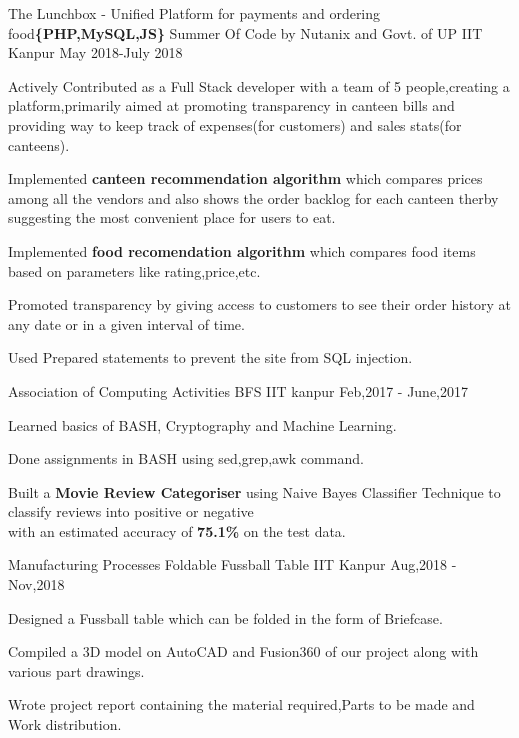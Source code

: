 
\begin{cventries}

  \cventry
  {The Lunchbox - Unified Platform for payments and ordering food\textbf{\{PHP,MySQL,JS\}}}
  {Summer Of Code by Nutanix and Govt. of UP}
  {IIT Kanpur}
  {May 2018-July 2018}
  {
    \begin{cvitems}
     \item Actively Contributed as a Full Stack developer with a team of 5 people,creating a platform,primarily aimed at promoting transparency in canteen bills and providing way to keep track of expenses(for customers) and sales stats(for canteens). 
     \item Implemented \textbf{canteen recommendation algorithm} which compares prices among all the vendors and also shows the order backlog for each canteen therby suggesting the most convenient place for users to eat. 
     \item Implemented \textbf{food recomendation algorithm} which compares food items based on parameters like rating,price,etc.
     \item Promoted transparency by giving access to customers to see their order history at any date or in a given interval of time. 
     \item Used Prepared statements to prevent the site from SQL injection.
    \end{cvitems}
  }

  \cventry
  {Association of Computing Activities}
  {BFS}
  {IIT kanpur}
  {Feb,2017 - June,2017}
  {
     \begin{cvitems}
      \item Learned basics of BASH, Cryptography and Machine Learning.
      \item Done assignments in BASH using sed,grep,awk command.
      \item Built a \textbf{Movie Review Categoriser} using Naive Bayes Classifier Technique
            to classify reviews into positive or negative\\ with an estimated accuracy of \textbf{75.1\%} on the test data.
     \end{cvitems}
  }

  \cventry 
  {Manufacturing Processes}
  {Foldable Fussball Table}
  {IIT Kanpur}
  {Aug,2018 - Nov,2018}
  {
    \begin{cvitems}
      \item Designed a Fussball table which can be folded in the form of Briefcase.
      \item Compiled a 3D model on AutoCAD and Fusion360 of our project along with various part drawings.
      \item Wrote project report containing the material required,Parts to be made and Work distribution.
    \end{cvitems}
  }


\end{cventries}
